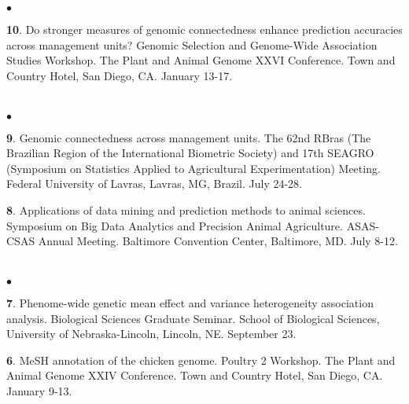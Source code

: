 \documentclass[margin,line,10pt]{res}
\newenvironment{list2}{
  \begin{list}{$\bullet$}{%
      \setlength{\itemsep}{0in}
      \setlength{\parsep}{0in} \setlength{\parskip}{0in}
      \setlength{\topsep}{0in} \setlength{\partopsep}{0in} 
      \setlength{\leftmargin}{0.2in}}}{\end{list}}
\begin{document}
\begin{resume}
\begin{list2}
  \vspace{0.5cm}
  
\item [{\bf 10}.] Do stronger measures of genomic connectedness enhance prediction accuracies across management units?  Genomic Selection and Genome-Wide Association Studies Workshop. The Plant and Animal Genome XXVI Conference. Town and Country Hotel, San Diego, CA. January 13-17. 
  
\end{list2}


\section{}
\begin{list2}
\item [{\bf 9}.] Genomic connectedness across management units. The 62nd RBras (The Brazilian Region of the International Biometric Society) and 17th SEAGRO (Symposium on Statistics Applied to Agricultural Experimentation) Meeting. Federal University of Lavras, Lavras, MG, Brazil. July 24-28. 
  
  \vspace{0.5cm}
  
  \item [{\bf 8}.] Applications of data mining and prediction methods to animal sciences. Symposium on Big Data Analytics and Precision Animal Agriculture. ASAS-CSAS Annual Meeting. Baltimore Convention Center, Baltimore, MD. July 8-12. 
  
\end{list2}



\section{}
\begin{list2}
\item [{\bf 7}.] Phenome-wide genetic mean effect and variance heterogeneity association analysis. Biological Sciences Graduate Seminar. School of Biological Sciences, University of Nebraska-Lincoln, Lincoln, NE. September 23.
  
  \vspace{0.5cm}
  
  \item [{\bf 6}.] MeSH annotation of the chicken genome. Poultry 2 Workshop. The Plant and Animal Genome XXIV Conference. Town and Country Hotel, San Diego, CA. January 9-13. 
  

\end{list2}
\end{resume}
\end{document}
